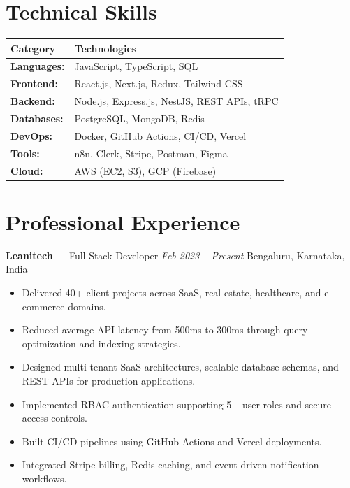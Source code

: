 \documentclass[10pt,a4paper]{article}
\begin{document}
\section*{Technical Skills}
\vspace{-15pt}
{\renewcommand{\arraystretch}{1.4} %
\begin{tabular}{ |p{5cm}||p{13.5cm}|  }

 Category & Technologies\\
 \hline
 \textbf{Languages:}          & JavaScript, TypeScript, SQL\\
 \hline
 \textbf{Frontend:}           & React.js, Next.js, Redux, Tailwind CSS\\
 \hline
 \textbf{Backend:}            & Node.js, Express.js, NestJS, REST APIs, tRPC\\
 \hline
 \textbf{Databases:}          & PostgreSQL, MongoDB, Redis\\
 \hline
 \textbf{DevOps:}             & Docker, GitHub Actions, CI/CD, Vercel\\
 \hline
 \textbf{Tools:}               & n8n, Clerk, Stripe, Postman, Figma\\
 \hline
 \textbf{Cloud:}              & AWS (EC2, S3), GCP (Firebase)\\
 \hline
\end{tabular}

\section*{Professional Experience}
\vspace{-10pt}
\textbf{Leanitech} — Full-Stack Developer \hfill \textit{Feb 2023 – Present}  
Bengaluru, Karnataka, India
\vspace{-5pt}  
\begin{itemize}[leftmargin=*, noitemsep]
    \item Delivered 40+ client projects across SaaS, real estate, healthcare, and e-commerce domains.
    \item Reduced average API latency from 500ms to 300ms through query optimization and indexing strategies.
    \item Designed multi-tenant SaaS architectures, scalable database schemas, and REST APIs for production applications.
    \item Implemented RBAC authentication supporting 5+ user roles and secure access controls.
    \item Built CI/CD pipelines using GitHub Actions and Vercel deployments.
    \item Integrated Stripe billing, Redis caching, and event-driven notification workflows.
\end{itemize}

}
\end{document}
